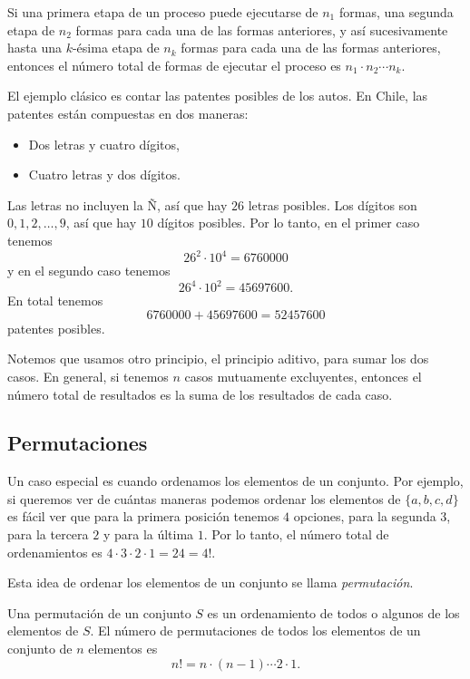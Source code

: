 \formal
\begin{definition}
Si una primera etapa de un proceso puede ejecutarse de \(n_1\) formas, una segunda etapa de \(n_2\) formas para cada una de las formas anteriores, y así sucesivamente hasta una \(k\)-ésima etapa de \(n_k\) formas para cada una de las formas anteriores, entonces el número total de formas de ejecutar el proceso es \(n_1 \cdot n_2 \cdots n_k\).
\end{definition}
\informal

El ejemplo clásico es contar las patentes posibles de los autos. En Chile, las patentes están compuestas en dos maneras:
\begin{itemize}
	\item Dos letras y cuatro dígitos,
	\item Cuatro letras y dos dígitos.
\end{itemize}
Las letras no incluyen la Ñ, así que hay \(26\) letras posibles. Los dígitos son \(0, 1, 2, \ldots, 9\), así que hay \(10\) dígitos posibles. Por lo tanto, en el primer caso tenemos \[26^2 \cdot 10^4 = \num{6760000}\] y en el segundo caso tenemos \[26^4 \cdot 10^2 = \num{45697600}.\] En total tenemos \[\num{6760000} + \num{45697600} = \num{52457600}\] patentes posibles.

Notemos que usamos otro principio, el principio aditivo, para sumar los dos casos. En general, si tenemos \(n\) casos mutuamente excluyentes, entonces el número total de resultados es la suma de los resultados de cada caso.

\subsection{Permutaciones}

Un caso especial es cuando ordenamos los elementos de un conjunto. Por ejemplo, si queremos ver de cuántas maneras podemos ordenar los elementos de \(\{a, b, c, d\}\) es fácil ver que para la primera posición tenemos \(4\) opciones, para la segunda \(3\), para la tercera \(2\) y para la última \(1\). Por lo tanto, el número total de ordenamientos es \(4 \cdot 3 \cdot 2 \cdot 1 = 24 = 4!\).

\formal
Esta idea de ordenar los elementos de un conjunto se llama \emph{permutación}.

\begin{definition}[Permutación]
Una permutación de un conjunto \(S\) es un ordenamiento de todos o algunos de los elementos de \(S\). El número de permutaciones de todos los elementos de un conjunto de \(n\) elementos es
\[n! = n \cdot (n-1) \cdots 2 \cdot 1.\]
\end{definition}

